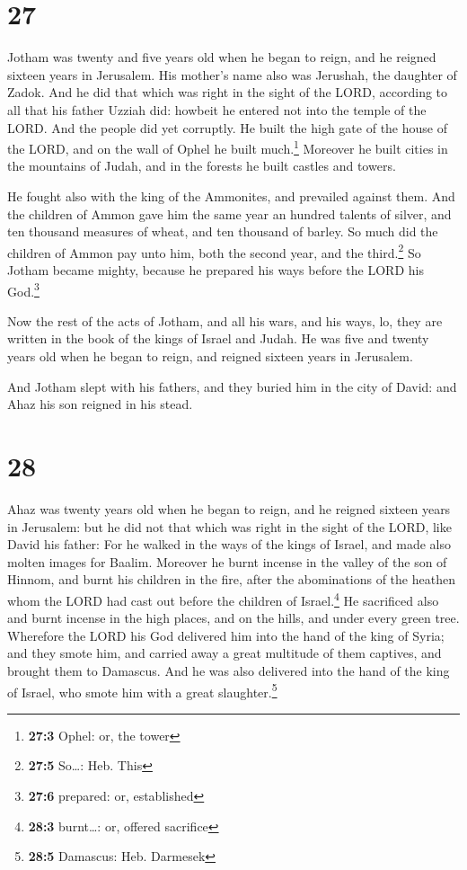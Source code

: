 \hypertarget{section-26}{%
\section{27}\label{section-26}}

 Jotham was twenty and five years old when he began to
reign, and he reigned sixteen years in Jerusalem. His mother's name also
was Jerushah, the daughter of Zadok.  And he did that
which was right in the sight of the LORD, according to all that his
father Uzziah did: howbeit he entered not into the temple of the LORD.
And the people did yet corruptly.  He built the high gate
of the house of the LORD, and on the wall of Ophel he built
much.\footnote{\textbf{27:3} Ophel: or, the tower} 
Moreover he built cities in the mountains of Judah, and in the forests
he built castles and towers.

 He fought also with the king of the Ammonites, and
prevailed against them. And the children of Ammon gave him the same year
an hundred talents of silver, and ten thousand measures of wheat, and
ten thousand of barley. So much did the children of Ammon pay unto him,
both the second year, and the third.\footnote{\textbf{27:5} So\ldots:
  Heb. This}  So Jotham became mighty, because he prepared
his ways before the LORD his God.\footnote{\textbf{27:6} prepared: or,
  established}

 Now the rest of the acts of Jotham, and all his wars, and
his ways, lo, they are written in the book of the kings of Israel and
Judah.  He was five and twenty years old when he began to
reign, and reigned sixteen years in Jerusalem.

 And Jotham slept with his fathers, and they buried him in
the city of David: and Ahaz his son reigned in his stead.

\hypertarget{section-27}{%
\section{28}\label{section-27}}

 Ahaz was twenty years old when he began to reign, and he
reigned sixteen years in Jerusalem: but he did not that which was right
in the sight of the LORD, like David his father:  For he
walked in the ways of the kings of Israel, and made also molten images
for Baalim.  Moreover he burnt incense in the valley of
the son of Hinnom, and burnt his children in the fire, after the
abominations of the heathen whom the LORD had cast out before the
children of Israel.\footnote{\textbf{28:3} burnt\ldots: or, offered
  sacrifice}  He sacrificed also and burnt incense in the
high places, and on the hills, and under every green tree.
 Wherefore the LORD his God delivered him into the hand of
the king of Syria; and they smote him, and carried away a great
multitude of them captives, and brought them to Damascus. And he was
also delivered into the hand of the king of Israel, who smote him with a
great slaughter.\footnote{\textbf{28:5} Damascus: Heb. Darmesek}

